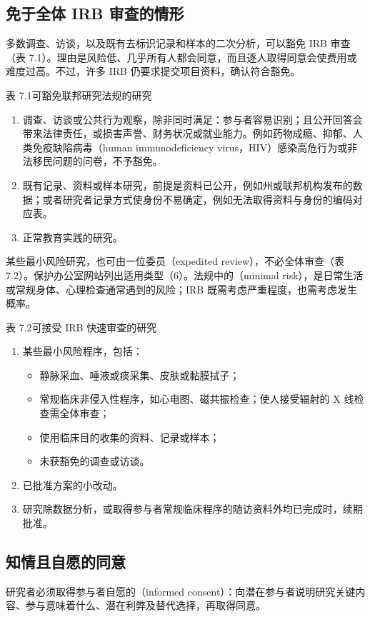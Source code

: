 \subsection{免于全体 IRB 审查的情形}
多数调查、访谈，以及既有去标识记录和样本的二次分析，可以豁免 IRB 审查（表 7.1）。理由是风险低、几乎所有人都会同意，而且逐人取得同意会使费用或难度过高。不过，许多 IRB 仍要求提交项目资料，确认符合豁免。
\begin{bookbox}{表 7.1\quad 可豁免联邦研究法规的研究}
\begin{enumerate}
\item 调查、访谈或公共行为观察，除非同时满足：参与者容易识别；且公开回答会带来法律责任，或损害声誉、财务状况或就业能力。例如药物成瘾、抑郁、人类免疫缺陷病毒（human immunodeficiency virus，HIV）感染高危行为或非法移民问题的问卷，不予豁免。
\item 既有记录、资料或样本研究，前提是资料已公开，例如州或联邦机构发布的数据；或者研究者记录方式使身份不易确定，例如无法取得资料与身份的编码对应表。
\item 正常教育实践的研究。
\end{enumerate}
\end{bookbox}
某些最小风险研究，也可由一位委员（expedited review），不必全体审查（表 7.2）。保护办公室网站列出适用类型（6）。法规中的（minimal risk），是日常生活或常规身体、心理检查通常遇到的风险；IRB 既需考虑严重程度，也需考虑发生概率。
\begin{bookbox}{表 7.2\quad 可接受 IRB 快速审查的研究}
\begin{enumerate}
\item 某些最小风险程序，包括：
\begin{itemize}
\item 静脉采血、唾液或痰采集、皮肤或黏膜拭子；
\item 常规临床非侵入性程序，如心电图、磁共振检查；使人接受辐射的 X 线检查需全体审查；
\item 使用临床目的收集的资料、记录或样本；
\item 未获豁免的调查或访谈。
\end{itemize}
\item 已批准方案的小改动。
\item 研究除数据分析，或取得参与者常规临床程序的随访资料外均已完成时，续期批准。
\end{enumerate}
\end{bookbox}

\subsection{知情且自愿的同意}
研究者必须取得参与者自愿的（informed consent）：向潜在参与者说明研究关键内容、参与意味着什么、潜在利弊及替代选择，再取得同意。
